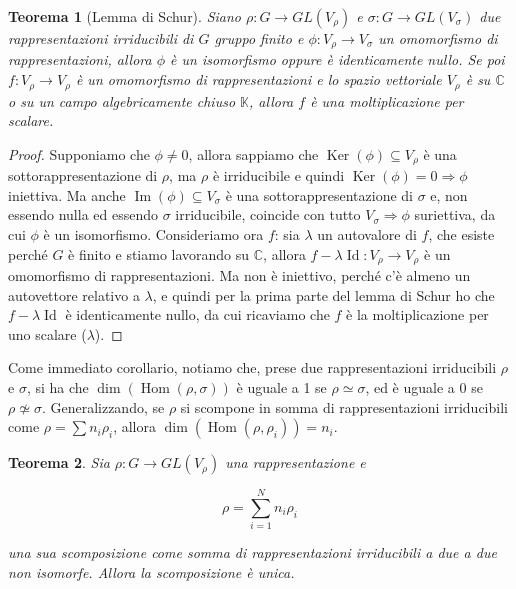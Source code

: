 \documentclass[11pt]{article}
\theoremstyle{plain}
\newtheorem{thm}{Teorema}[section]
\theoremstyle{definition}
\theoremstyle{remark}
\newcommand{\C}{\mathbb{C}}
\newcommand{\K}{\mathbb{K}}
\newcommand{\dsum}{\displaystyle\sum}
\DeclareMathOperator{\Hom}{Hom}
\DeclareMathOperator{\Ker}{Ker}
\DeclareMathOperator{\Imm}{Im}
\DeclareMathOperator{\Id}{Id}
\begin{document}
\begin{thm}[Lemma di Schur]
Siano $\rho: G \to GL(V_\rho)$ e $\sigma: G \to GL(V_\sigma)$ due rappresentazioni irriducibili di $G$ gruppo finito e $\phi:V_\rho \to V_\sigma$ un omomorfismo di rappresentazioni, allora $\phi$ è un isomorfismo oppure è identicamente nullo. Se poi $f:V_\rho\to V_\rho$ è un omomorfismo di rappresentazioni e lo spazio vettoriale $V_\rho$ è su $\C$ o su un campo algebricamente chiuso $\K$, allora $f$ è una moltiplicazione per scalare.
\end{thm}
\begin{proof}
Supponiamo che $\phi\neq 0$, allora sappiamo che $\Ker(\phi)\subseteq V_\rho$ è una sottorappresentazione di $\rho$, ma $\rho$ è irriducibile e quindi $\Ker(\phi)=0\Rightarrow \phi$ iniettiva. Ma anche $\Imm(\phi)\subseteq V_{\sigma}$ è una sottorappresentazione di $\sigma$ e, non essendo nulla ed essendo $\sigma$ irriducibile, coincide con tutto $V_\sigma \Rightarrow \phi$ suriettiva, da cui $\phi$ è un isomorfismo.
Consideriamo ora $f$: sia $\lambda$ un autovalore di $f$, che esiste perché $G$ è finito e stiamo lavorando su $\C$, allora $f-\lambda \Id:V_\rho\to V_\rho$ è un omomorfismo di rappresentazioni. Ma non è iniettivo, perché c'è almeno un autovettore relativo a $\lambda$, e quindi per la prima parte del lemma di Schur ho che $f-\lambda \Id$ è identicamente nullo, da cui ricaviamo che $f$ è la moltiplicazione per uno scalare ($\lambda$).
\end{proof}

Come immediato corollario, notiamo che, prese due rappresentazioni irriducibili $\rho$ e $\sigma$, si ha che $\dim\left(\Hom(\rho,\sigma)\right)$ è uguale a 1 se $\rho\simeq\sigma$, ed è uguale a 0 se $\rho\not\simeq\sigma$. Generalizzando, se $\rho$ si scompone in somma di rappresentazioni irriducibili come $\rho=\sum n_i\rho_i$, allora $\dim\left(\Hom(\rho,\rho_i)\right)=n_i$.



\begin{thm}
Sia $\rho: G \to GL(V_\rho)$ una rappresentazione e

\[\rho = \dsum_{i=1}^N n_i \rho_i \]

una sua scomposizione come somma di rappresentazioni irriducibili a due a due non isomorfe. Allora la scomposizione è unica.
\end{thm}
\end{document}

